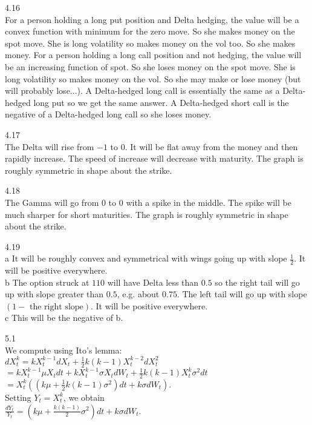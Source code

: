 4.16 \\
For a person holding a long put position and Delta hedging, the value will be a convex function with minimum for the zero move. So she makes money on the spot move. She is long volatility so makes money on the vol too. So she makes money. For a person holding a long call position and not hedging, the value will be an increasing function of spot. So she loses money on the spot move. She is long volatility so makes money on the vol. So she may make or lose money (but will probably lose...). A Delta-hedged long call is essentially the same as a Delta-hedged long put so we get the same answer. A Delta-hedged short call is the negative of a Delta-hedged long call so she loses money.

4.17 \\
The Delta will rise from $-1$ to $0$. It will be flat away from the money and then rapidly increase. The speed of increase will decrease with maturity. The graph is roughly symmetric in shape about the strike.

4.18 \\
The Gamma will go from $0$ to $0$ with a spike in the middle. The spike will be much sharper for short maturities. The graph is roughly symmetric in shape about the strike.

4.19 \\
a It will be roughly convex and symmetrical with wings going up with slope $\frac{1}{2}$. It will be positive everywhere. \\
b The option struck at $110$ will have Delta less than $0.5$ so the right tail will go up with slope greater than $0.5$, e.g. about $0.75$. The left tail will go up with slope $(1-\text{ the right slope})$. It will be positive everywhere. \\
c This will be the negative of b.

5.1 \\
We compute using Ito's lemma: \\
$dX_t^k= k X_t^{k-1} dX_t + \frac{1}{2} k(k-1) X_t^{k-2} dX_t^2$ \\
$= k X_t^{k-1} \mu X_t dt + k X_t^{k-1} \sigma X_t dW_t + \frac{1}{2} k(k-1) X_t^k \sigma^2 dt$ \\
$= X_t^k \left( \left( k \mu + \frac{1}{2}k(k-1)\sigma^2 \right)dt + k \sigma dW_t \right)$. \\
Setting $Y_t = X_t^k$, we obtain \\
$\frac{d Y_t}{Y_t} = \left( k \mu + \frac{k(k-1)}{2} \sigma^2 \right) dt + k \sigma dW_t$.

